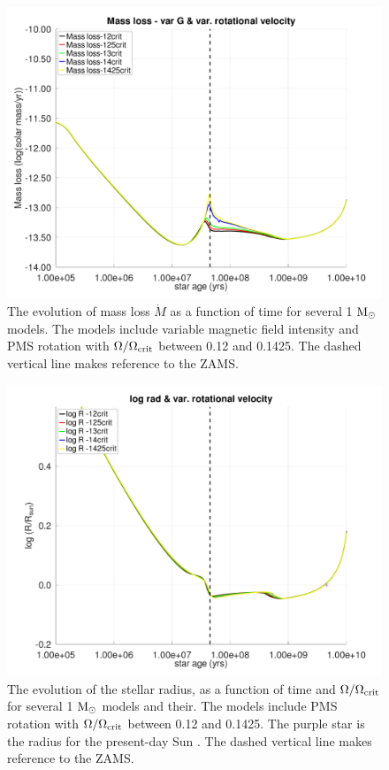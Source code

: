 \documentclass[fleqn,usenatbib]{mnras}
\begin{document}
\begin{figure}
	\includegraphics[clip,width=\columnwidth]{figures/paper2/mdot_var_vel_g3.pdf}
    \caption{The evolution of mass loss $\Dot{M}$ as a function of time for several 1 $\mathrm{M}_\odot$ models. The models include variable magnetic field intensity and PMS rotation with $\Omega / \Omega_{\mathrm{crit}}$ between 0.12 and 0.1425. The dashed vertical line makes reference to the ZAMS.}
    \label{fig:mdot_var_vel_g3}
\end{figure}



\begin{figure}
	\includegraphics[clip,width=\columnwidth]{figures/paper2/lograd_var_vel_g3.pdf}
    \caption{The evolution of the stellar radius, as a function of time and $\Omega / \Omega_{\mathrm{crit}}$ for several 1 $\mathrm{M}_\odot$ models and their. The models include PMS rotation with $\Omega / \Omega_{\mathrm{crit}}$ between 0.12 and 0.1425. The purple star is the radius for the present-day Sun \citep{Gill2012}. The dashed vertical line makes reference to the ZAMS.}
    \label{fig:lograd_var_vel_g3}
\end{figure}
\end{document}
